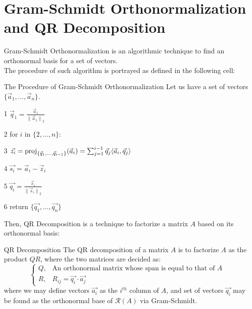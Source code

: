 \section{Gram-Schmidt Orthonormalization and QR Decomposition}
Gram-Schmidt Orthonormalization is an algorithmic technique to find an orthonormal basis for a set of vectors. \\
The procedure of such algorithm is portrayed as defined in the following cell:
\begin{ln-define}{The Procedure of Gram-Schmidt Orthonormalization}{}
    Let us have a set of vectors $\{\vec{a}_1, \dots, \vec{a}_n\}$.
    \begin{bindenum}
        \item[1] $\vec{q}_1 = \frac{\vec{a}_1}{{\lVert \vec{a}_1 \rVert}_2}$
        \item[2] for $i$ in $\{2, \dots, n\}$:
        \item[3] \hspace{0.5cm} $\vec{z_i} = \text{proj}_{\{\vec{q}_1, \dots, \vec{q}_{i - 1}\}}(\vec{a}_i) = \sum_{j = 1}^{i - 1} \vec{q}_j \langle \vec{a}_i, \vec{q}_j \rangle$
        \item[4] \hspace{0.5cm} $\vec{s_i} = \vec{a}_i - \vec{z}_i$
        \item[5] \hspace{0.5cm} $\vec{q_i} = \frac{\vec{s}_i}{{\lVert \vec{s}_i \rVert}_2}$
        \item[6] return $\{\vec{q_1}, \dots, \vec{q_n}\}$
    \end{bindenum}
\end{ln-define}
\par
Then, QR Decomposition is a technique to factorize a matrix $A$ based on its orthonormal basis:
\begin{ln-define}{QR Decomposition}{}
    The QR decomposition of a matrix $A$ is to factorize $A$ as the product $QR$, where the two matrices are decided as:
    \[
        \begin{cases}
            Q, &\text{An orthonormal matrix whose span is equal to that of $A$} \\
            R, &R_{ij} = \vec{q_i} \cdot \vec{a_j}
        \end{cases}
    \]
    where we may define vectors $\vec{a_i}$ as the $i^{th}$ column of $A$, and set of vectors $\vec{q_i}$ may be found as the orthonormal base of $\mathcal{R}(A)$ via Gram-Schmidt.
\end{ln-define}
